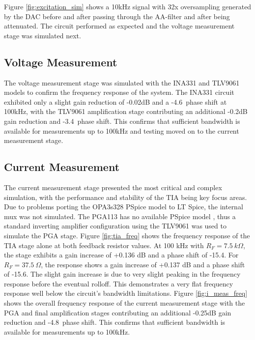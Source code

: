 Figure \ref{fig:excitation_sim} shows a 10kHz signal with 32x oversampling generated by the DAC before and after passing through the AA-filter and after being attenuated. The circuit performed as expected and the voltage measurement stage was simulated next.

\subsection{Voltage Measurement}
The voltage measurement stage was simulated with the INA331 and TLV9061 models to confirm the frequency response of the system. The INA331 circuit exhibited only a slight gain reduction of -0.02dB and a -4.6\textdegree\ phase shift at 100kHz, with the TLV9061 amplification stage contributing an additional -0.2dB gain reduction and -3.4\textdegree\ phase shift. This confirms that sufficient bandwidth is available for measurements up to 100kHz and testing moved on to the current measurement stage.


\subsection{Current Measurement}
The current measurement stage presented the most critical and complex simulation, with the performance and stability of the TIA being key focus areas.
Due to problems porting the OPA3s328 PSpice model to LT Spice, the internal mux was not simulated. The PGA113 has no available PSpice model \cite{PGA113PspiceModel2022}, thus a standard inverting amplifier configuration using the TLV9061 was used to simulate the PGA stage. Figure \ref{fig:tia_freq} shows the frequency response of the TIA stage alone at both feedback resistor values. At 100 kHz with $R_F = 7.5~k\Omega$, the stage exhibits a gain increase of +0.136 dB and a phase shift of -15.4\textdegree. For $R_F = 37.5~\Omega$, the response shows a gain increase of +0.137 dB and a phase shift of -15.6\textdegree. The slight gain increase is due to very slight peaking in the frequency response before the eventual rolloff. This demonstrates a very flat frequency response well below the circuit's bandwidth limitations. Figure \ref{fig:i_meas_freq} shows the overall frequency response of the current measurement stage with the PGA and final amplification stages contributing an additional -0.25dB gain reduction and -4.8\textdegree\ phase shift. This confirms that sufficient bandwidth is available for measurements up to 100kHz.

